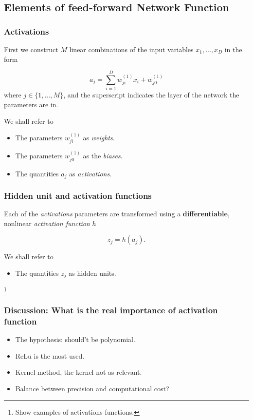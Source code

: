\subsection{Elements of feed-forward Network Function}
\begin{frame}
  \frametitle{Activations}

  First we construct $M$ linear combinations of the input
  variables $x_1, \ldots, x_D$ in the form

  \begin{equation}
    a_j 
    = 
    \sum_{i = 1}^D
    w_{j i}^{(1)} x_i
    +
    w_{j 0}^{(1)}
  \end{equation}
  where $j \in \{1, \ldots, M\}$, and the superscript indicates the layer of the network the parameters are in.
  
  We shall refer to 
  \begin{itemize}
    \item The parameters $w_{j i}^{(1)}$ as \textit{weights}.
    \item The parameters $w_{j 0}^{(1)}$ as the \textit{biases}. 
    \item The quantities $a_j$ as \textit{activations}. 
  \end{itemize}
\end{frame}
\begin{frame}
  \frametitle{Hidden unit and activation functions }

  Each of the \textit{activations} parameters are transformed 
  using a \textbf{differentiable}, nonlinear 
  \textit{activation function} $h$

  \begin{equation}\label{eq:05:hidden_units_definiton}
    z_j = h(a_j). 
  \end{equation}

  We shall refer to 
  \begin{itemize}
    \item The quantities $z_j$ as hidden units. 
  \end{itemize}
\footnote{Show examples of activations functions.} 
\end{frame}

\begin{frame}
  \frametitle{Discussion: What is the real importance of activation function}
  \begin{itemize}
    \item The hypothesis: should't be polynomial.
    \item ReLu is the most used.
    \item Kernel method, the kernel not as relevant.
    \item Balance between precision  and computational cost?
  \end{itemize}
  

\end{frame}

